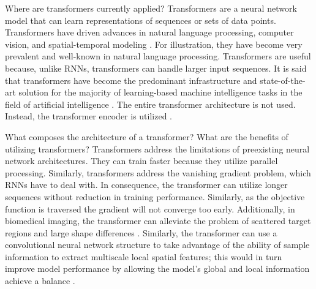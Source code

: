 \documentclass[11pt, a4paper]{article}
\begin{document}
Where are transformers currently applied? Transformers are a neural network model that can learn
representations of sequences or sets of data points. Transformers have driven advances in natural language
processing, computer vision, and spatial-temporal modeling \cite{turner2024introductiontransformers}. For illustration, they have become very
prevalent and well-known in natural language processing. Transformers are useful because, unlike RNNs,
transformers can handle larger input sequences. It is said that transformers have become the predominant
infrastructure and state-of-the-art solution for the majority of learning-based machine intelligence tasks in
the field of artificial intelligence \cite{islam2023comprehensivesurveyapplicationstransformers}. The entire transformer architecture is not used. Instead, the transformer
encoder is utilized \cite{turner2024introductiontransformers}.

What composes the architecture of a transformer?
What are the benefits of utilizing transformers? Transformers address the limitations of preexisting neural
network architectures. They can train faster because they utilize parallel processing. Similarly, transformers
address the vanishing gradient problem, which RNNs have to deal with. In consequence, the transformer can
utilize longer sequences without reduction in training performance. Similarly, as the objective function is
traversed the gradient will not converge too early. Additionally, in biomedical imaging, the transformer can
alleviate the problem of scattered target regions and large shape differences \cite{article}. Similarly, the transformer
can use a convolutional neural network structure to take advantage of the ability of sample information
to extract multiscale local spatial features; this would in turn improve model performance by allowing the
model’s global and local information achieve a balance \cite{article}.
\end{document}
